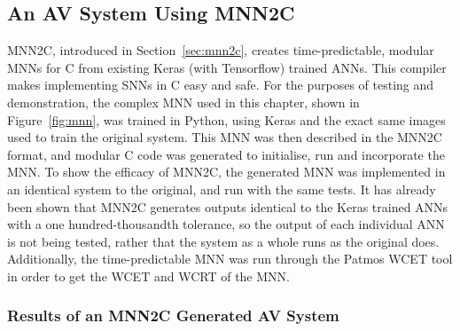 \subsection{An \ac{AV} System Using \acf{MNN2C}}
\ac{MNN2C}, introduced in Section~\ref{sec:mnn2c}, creates time-predictable, modular \acfp{MNN} for C from existing Keras (with Tensorflow) trained \acp{ANN}. 
This compiler makes implementing \acfp{SNN} in C easy and safe.
For the purposes of testing and demonstration, the complex \ac{MNN} used in this chapter, shown in Figure~\ref{fig:mnn}, was trained in Python, using Keras and the exact same images used to train the original system.
This \ac{MNN} was then described in the \ac{MNN2C} format, and modular C code was generated to initialise, run and incorporate the \ac{MNN}.
To show the efficacy of \ac{MNN2C}, the generated \ac{MNN} was implemented in an identical system to the original, and run with the same tests. 
It has already been shown that \ac{MNN2C} generates outputs identical to the Keras trained \acp{ANN} with a one hundred-thousandth tolerance, so the output of each individual \ac{ANN} is not being tested, rather that the system as a whole runs as the original does.
Additionally, the time-predictable \ac{MNN} was run through the Patmos \ac{WCET} tool in order to get the \ac{WCET} and \ac{WCRT} of the \ac{MNN}.

\subsubsection{Results of an \ac{MNN2C} Generated \ac{AV} System}
\begin{table}[h]
	\centering
	\caption{Table showing the best results of the \ac{AV} prediction \ac{MNN} using original images, generated by \ac{MNN2C} and trained for 100 epochs}
	\label{tbl:sign-resmnn}
\end{table}

